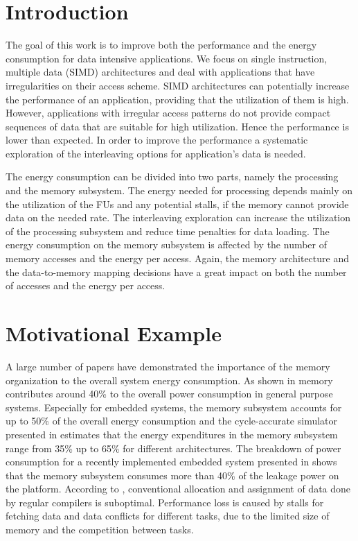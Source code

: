 \documentclass[prodmode,acmtodaes]{acmsmall}
\begin{document}
\maketitle

\section{Introduction}

The goal of this work is to improve both the performance and the energy consumption for data intensive applications. 
We focus on single instruction, multiple data (SIMD) architectures and deal with applications that have irregularities on their access scheme. 
SIMD architectures can potentially increase the performance of an application, providing that the utilization of them is high. 
However, applications with irregular access patterns do not provide compact sequences of data that are suitable for high utilization. 
Hence the performance is lower than expected. 
In order to improve the performance a systematic exploration of the interleaving options for application's data is needed. 

The energy consumption can be divided into two parts, namely the processing and the memory subsystem. 
The energy needed for processing depends mainly on the utilization of the FUs and any potential stalls, if the memory cannot provide data on the needed rate.
The interleaving exploration can increase the utilization of the processing subsystem and reduce time penalties for data loading.   
The energy consumption on the memory subsystem is affected by the number of memory accesses and the energy per access. 
Again, the memory architecture and the data-to-memory mapping decisions have a great impact on both the number of accesses and the energy per access.

\section{Motivational Example}
\label{sec:motivational}

A large number of papers have demonstrated the importance of the memory organization to the overall system energy consumption. 
As shown in \cite{Gonzalez1996} memory contributes around 40\% to the overall power consumption in general purpose systems. 
Especially for embedded systems, the memory subsystem accounts for up to 50\% of the overall energy consumption \cite{Che09} and the cycle-accurate simulator presented in \cite{Ben99} estimates that the energy expenditures in the memory subsystem range from 35\% up to 65\% for different architectures. 
The breakdown of power consumption for a recently implemented embedded system presented in \cite{Hul11} shows that the memory subsystem consumes more than 40\% of the leakage power on the platform. 
According to \cite{tcm}, conventional allocation and assignment of data done by regular compilers is suboptimal. 
Performance loss is caused by stalls for fetching data and data conflicts for different tasks, due to the limited size of memory and the competition between tasks. 
\end{document}
